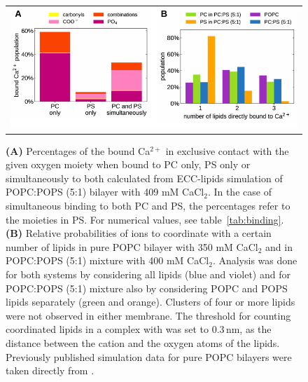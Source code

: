 \documentclass[journal=jpcbfk,manuscript=article]{achemso}
\newlength{\figwidth}
\newlength{\figwidthfull}
\begin{document}

\begin{figure}[tbp!] 
  \centering 
  \begin{tabular}{ c }
  \includegraphics[width=\figwidthfull]{../img/populations_stoichiometry.pdf} 
  \end{tabular}
  \caption{ \label{fig:cacl_complexes} 
    \textbf{(A)} Percentages of the bound Ca$^{2+}$ 
    in exclusive contact with the given oxygen moiety
    when bound to PC only, PS only or simultaneously to both
    calculated from ECC-lipids simulation of POPC:POPS (5:1) bilayer with 409 mM CaCl$_2$. 
	In the case of simultaneous binding to both PC and PS,
	the percentages refer to the moieties in PS.
        For numerical values, see table~\ref{tab:binding}.
    \textbf{(B)} Relative probabilities of  ions to coordinate with a certain number of lipids
    in pure POPC bilayer with 350 mM CaCl$_2$ and in POPC:POPS (5:1) mixture with 400 mM CaCl$_2$.  
    Analysis was done for both systems by considering all lipids (blue and violet) and
    for POPC:POPS (5:1) mixture also by considering POPC and POPS lipids separately (green and orange). 
    Clusters of four or more lipids were not observed in either membrane.
    The threshold for counting coordinated lipids in a complex with  was set to $0.3\,\mathrm{nm}$, 
    as the distance between the cation and the oxygen atoms of the lipids. 
    Previously published simulation data \cite{melcr18} for pure POPC bilayers were taken directly from \cite{ECC-POPC_nacl_cacl2_files}. 
  }
\end{figure} 
\end{document}
